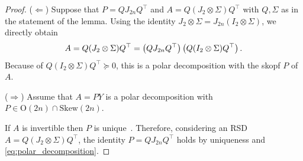 \documentclass[final,onefignum,onetabnum,dvipsnames]{siamart251216}
\numberwithin{algorithm}{section}
\numberwithin{equation}{section}
\begin{document}
\begin{proof}
    ($\Longleftarrow $) Suppose that $P = QJ_{2n}Q^\top$ and $A=Q(J_2 \otimes \Sigma)Q^\top$ with $Q,\Sigma$ as
    in the statement of the lemma. Using the identity $ J_{2}\otimes \Sigma = J_{2n} (I_2 \otimes \Sigma)$, we directly obtain 
    \begin{equation}\label{eq:polar_decomposition}
        A =  Q (J_2 \otimes \Sigma)Q^\top \\
            =  \left( Q J_{2n} Q^\top\right)\left( Q (I_2\otimes \Sigma)Q^\top\right).
    \end{equation}
    Because of $Q( I_2\otimes \Sigma) Q^\top\succeq 0$, this is a polar decomposition with the skopf $P$ of $A$.
   
    ($\Longrightarrow$) Assume that $A = PY$ is a polar decomposition with $P\in\mathrm{O}(2n)\cap \mathrm{Skew}(2n)$. 
    
    If $A$ is invertible then $P$ is unique~\cite[Chap.~9.4.3]{golubvanloan}. Therefore, considering an RSD $A=Q(J_2 \otimes \Sigma)Q^\top$, the identity $P=QJ_{2n} Q^\top$ holds by uniqueness and \eqref{eq:polar_decomposition}.%


\end{proof}
\end{document}
